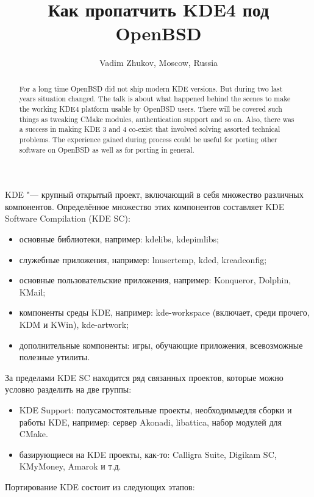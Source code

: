 \documentclass[10pt, a5paper]{article}
\begin{document}
\title{Как пропатчить KDE4 под OpenBSD}
\author{Vadim Zhukov, Moscow, Russia}
\maketitle
\begin{abstract}
For a long time OpenBSD did not ship modern KDE versions. But during two last years situation changed. The talk is about what happened behind the scenes to make the working KDE4 platform usable by OpenBSD users. There will be covered such things as tweaking CMake modules, authentication support and so on. Also, there was a success in making KDE 3 and 4 co-exist that involved solving assorted technical problems. The experience gained during process could be useful for porting other software on OpenBSD as well as for porting in general.
\end{abstract}
KDE "--- крупный открытый проект, включающий в себя множество различных компонентов. Определённое множество этих компонентов составляет KDE Software Compilation (KDE SC):
\begin{itemize}
 \item основные библиотеки, например: kdelibs, kdepimlibs;
 \item служебные приложения, например: lnusertemp, kded, kread\-con\-fig;
 \item основные пользовательские приложения, например: Kon\-quer\-or, Dolphin, KMail;
 \item компоненты среды KDE, например: kde-workspace (включает, среди прочего, KDM и KWin), kde-artwork;
 \item дополнительные компоненты: игры, обучающие приложения, всевозможные полезные утилиты.
\end{itemize}

За пределами KDE SC находится ряд связанных проектов, которые можно условно разделить на две группы:
\begin{itemize}
 \item KDE Support: полусамостоятельные проекты, необходимые\linebreak для сборки и работы KDE, например: сервер Akonadi, lib\-at\-ti\-ca, набор модулей для CMake.
 \item базирующиеся на KDE проекты, как-то: Calligra Suite, Digikam SC, KMyMoney, Amarok и т.д.
\end{itemize}

Портирование KDE состоит из следующих этапов:
\end{document}
